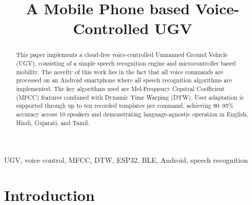 \documentclass[conference]{IEEEtran}
\begin{document}
	
	\title{A Mobile Phone based Voice-Controlled UGV
	}
	
	\author{
	}
	
	\maketitle
	
	\begin{abstract}
		This paper implements a cloud-free voice-controlled Unmanned Ground
		Vehicle (UGV), consisting of a simple speech recognition engine and microcontroller based mobility.
		The novelty of this work lies in the fact that
		all 
		voice commands are processed 
		on an Android
		smartphone 
		where  all speech recognition algorithms are implemented.
		The key algorithms used are Mel-Frequency Cepstral Coefficient (MFCC) features
		combined with Dynamic Time Warping (DTW).
		User adaptation is supported through up to ten recorded templates
		per command, achieving 90--95\% accuracy across 10 speakers and demonstrating
		language-agnostic operation in English, Hindi, Gujarati, and Tamil.
		
	\end{abstract}
	
	\begin{IEEEkeywords}
		UGV, voice control, MFCC, DTW, ESP32, BLE, Android, speech recognition
	\end{IEEEkeywords}
	
	\section{Introduction} \label{sec:intro}
	
\end{document}
